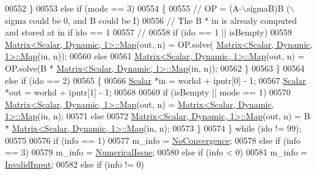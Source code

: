 \begin{DoxyCode}
00552       \}
00553       \textcolor{keywordflow}{else} \textcolor{keywordflow}{if} (mode == 3)
00554       \{
00555         \textcolor{comment}{// OP = (A-\(\backslash\)sigmaB)B (\(\backslash\)sigma could be 0, and B could be I)}
00556         \textcolor{comment}{// The B * in is already computed and stored at in if ido == 1}
00557         \textcolor{comment}{//}
00558         \textcolor{keywordflow}{if} (ido == 1 || isBempty)
00559           \hyperlink{group___core___module_class_eigen_1_1_matrix}{Matrix<Scalar, Dynamic, 1>::Map}(out, n) = OP.solve(
      \hyperlink{group___core___module_class_eigen_1_1_matrix}{Matrix<Scalar, Dynamic, 1>::Map}(in, n));
00560         \textcolor{keywordflow}{else}
00561           \hyperlink{group___core___module_class_eigen_1_1_matrix}{Matrix<Scalar, Dynamic, 1>::Map}(out, n) = OP.solve(B * 
      \hyperlink{group___core___module_class_eigen_1_1_matrix}{Matrix<Scalar, Dynamic, 1>::Map}(in, n));
00562       \}
00563     \}
00564     \textcolor{keywordflow}{else} \textcolor{keywordflow}{if} (ido == 2)
00565     \{
00566       \hyperlink{class_eigen_1_1_arpack_generalized_self_adjoint_eigen_solver_ab1182405bfe87a505d4b7a8311c661ec}{Scalar} *in  = workd + ipntr[0] - 1;
00567       \hyperlink{class_eigen_1_1_arpack_generalized_self_adjoint_eigen_solver_ab1182405bfe87a505d4b7a8311c661ec}{Scalar} *out = workd + ipntr[1] - 1;
00568 
00569       \textcolor{keywordflow}{if} (isBempty || mode == 1)
00570         \hyperlink{group___core___module_class_eigen_1_1_matrix}{Matrix<Scalar, Dynamic, 1>::Map}(out, n) = 
      \hyperlink{group___core___module_class_eigen_1_1_matrix}{Matrix<Scalar, Dynamic, 1>::Map}(in, n);
00571       \textcolor{keywordflow}{else}
00572         \hyperlink{group___core___module_class_eigen_1_1_matrix}{Matrix<Scalar, Dynamic, 1>::Map}(out, n) = B * 
      \hyperlink{group___core___module_class_eigen_1_1_matrix}{Matrix<Scalar, Dynamic, 1>::Map}(in, n);
00573     \}
00574   \} \textcolor{keywordflow}{while} (ido != 99);
00575 
00576   \textcolor{keywordflow}{if} (info == 1)
00577     m\_info = \hyperlink{group__enums_gga85fad7b87587764e5cf6b513a9e0ee5eaba1c8763d1179778070f365ecc4157a8}{NoConvergence};
00578   \textcolor{keywordflow}{else} \textcolor{keywordflow}{if} (info == 3)
00579     m\_info = \hyperlink{group__enums_gga85fad7b87587764e5cf6b513a9e0ee5eaaf9b736d310a664e7729d163a035cc5f}{NumericalIssue};
00580   \textcolor{keywordflow}{else} \textcolor{keywordflow}{if} (info < 0)
00581     m\_info = \hyperlink{group__enums_gga85fad7b87587764e5cf6b513a9e0ee5ea945604f62795ffc70aedf2bd12ea0434}{InvalidInput};
00582   \textcolor{keywordflow}{else} \textcolor{keywordflow}{if} (info != 0)

\end{DoxyCode}
